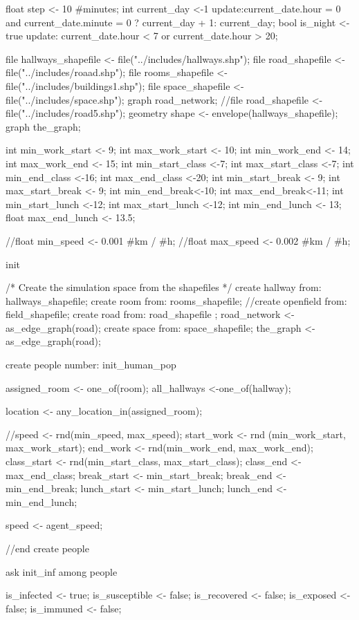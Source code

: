 \begin{verbatimtab}[4]
{    
   float step <- 10 #minutes;
   int current_day <-1 update:current_date.hour = 0 and current_date.minute = 0 ? current_day + 1: current_day;
   bool is_night <- true update: current_date.hour < 7 or current_date.hour > 20;
    
    file hallways_shapefile <- file("../includes/hallways.shp");
	file road_shapefile <- file("../includes/roaad.shp");	
	file rooms_shapefile <- file("../includes/buildings1.shp");
	file space_shapefile <- file("../includes/space.shp");	
	graph road_network;	
	//file road_shapefile <- file("../includes/road5.shp");		
    geometry shape <- envelope(hallways_shapefile);	
    graph the_graph;
    
    int min_work_start <- 9;
	int max_work_start <- 10;
	int min_work_end <- 14; 
	int max_work_end <- 15; 
	int min_start_class <-7;
	int max_start_class <-7;
	int min_end_class <-16;
	int max_end_class <-20;
	int min_start_break <- 9;
	int max_start_break <- 9;
	int min_end_break<-10;
	int max_end_break<-11;
	int min_start_lunch <-12;
	int max_start_lunch <-12;
	int min_end_lunch <- 13;
	float max_end_lunch <- 13.5;

	
	//float min_speed <- 0.001 #km / #h;
	//float max_speed <- 0.002 #km / #h;
    
    init {
    	/* Create the simulation space from the shapefiles */
		create hallway from: hallways_shapefile;
		create room from: rooms_shapefile;
		//create openfield from: field_shapefile;
		create road from: road_shapefile ;
		road_network <- as_edge_graph(road);
		create space from: space_shapefile;
		the_graph <- as_edge_graph(road);

        create people number: init_human_pop {
			assigned_room <- one_of(room);
			all_hallways <-one_of(hallway);
			
	   		location <- any_location_in(assigned_room);
	   		
	   		
	   		//speed <- rnd(min_speed, max_speed);
			start_work <- rnd (min_work_start, max_work_start);
			end_work <- rnd(min_work_end, max_work_end);
			class_start <- rnd(min_start_class, max_start_class);
			class_end <- max_end_class;
			break_start <- min_start_break;
			break_end <- min_end_break;
			lunch_start <- min_start_lunch;
			lunch_end <- min_end_lunch;
			
			
        	
            speed <- agent_speed;
            
        }//end create people 

        ask init_inf among people {
           is_infected <- true;
           is_susceptible <- false;
           is_recovered <- false;
           is_exposed <-false;   
           is_immuned <- false;  
           
}}}
\end{verbatimtab}

